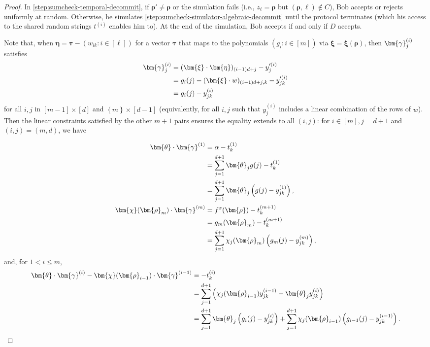 \documentclass[a4paper,UKenglish,cleveref, autoref, thm-restate]{lipics-v2021}
\theoremstyle{definition}
\renewcommand{\set}[1]{\left\{#1\right\}}
\newcommand{\vcommitstring}{z}
\newcommand{\pcommitstring}{y}
\newcommand{\dimension}{m}
\newcommand{\degree}{d}
\newcommand{\fingerprinttuple}{\bm{\rho}}
\def\fe#1{
    \ifnum#1=1
        \alpha
    \else
    \ifnum#1=2
        \beta
    \else
    \ifnum#1=3
        \gamma
    \fi\fi\fi
}
\begin{document}
\begin{proof}
    In \cref{step:sumcheck-temporal-decommit}, if $\fingerprinttuple' \neq \fingerprinttuple$ or the simulation fails (i.e., $\vcommitstring_\ell = \fingerprinttuple$ but $(\fingerprinttuple, \ell) \notin C$), Bob accepts or rejects uniformly at random. Otherwise, he simulates \cref{step:sumcheck-simulator-algebraic-decommit} until the protocol terminates (which his access to the shared random strings $t^{(i)}$ enables him to).
    At the end of the simulation, Bob accepts if and only if $D$ accepts.
    
    Note that, when $\bm{\eta} = \bm{\tau} - (w_{ik} : i \in [\ell])$ for a vector $\bm{\tau}$ that maps to the polynomials $(g_i : i \in [\dimension])$ via $\bm{\xi} = \bm{\xi}(\fingerprinttuple)$, then $\bm{\fe3}^{(i)}_j$ satisfies
    \begin{align*}
        \bm{\fe3}^{(i)}_j &= (\bm{\xi} \cdot \bm{\eta})_{(i - 1) \degree + j} -  \pcommitstring'^{(i)}_j\\
        &= g_i(j) - (\bm{\xi} \cdot w)_{(i - 1) \degree + j, k} - \pcommitstring'^{(i)}_{jk}\\
        &= g_i(j) - \pcommitstring^{(i)}_{jk}
    \end{align*}
    for all $i,j$ in $[\dimension - 1] \times [\degree]$ and $\set{\dimension} \times [\degree - 1]$ (equivalently, for all $i,j$ such that $\pcommitstring^{(i)}_j$ includes a linear combination of the rows of $w$). Then the linear constraints satisfied by the other $\dimension + 1$ pairs ensures the equality extends to all $(i, j)$: for $i \in [\dimension], j = \degree + 1$ and $(i, j) = (\dimension, \degree)$, we have
    
    \begin{align*}
        \bm{\theta} \cdot \bm{\fe3}^{(1)} &= \fe1 - t_k^{(1)}\\
        &= \sum_{j = 1}^{\degree + 1} \bm{\theta}_j g(j) - t_k^{(1)}\\
        &= \sum_{j = 1}^{\degree + 1} \bm{\theta}_j \left(g(j) - \pcommitstring_{jk}^{(1)}\right),\\
        \bm{\chi}(\fingerprinttuple_\dimension) \cdot \bm{\fe3}^{(\dimension)} &= f^x(\fingerprinttuple) - t_k^{(\dimension+1)}\\
        &= g_\dimension(\fingerprinttuple_\dimension) - t_k^{(\dimension+1)}\\
        &= \sum_{j = 1}^{\degree + 1} \chi_j(\fingerprinttuple_\dimension) \left(g_\dimension(j) - \pcommitstring^{(\dimension)}_{jk}\right),
    \end{align*}
    and, for $1 < i \leq \dimension$,
    \begin{align*}
        \bm{\theta} \cdot \bm{\fe3}^{(i)} - \bm{\chi}(\fingerprinttuple_{i-1}) \cdot \bm{\fe3}^{(i-1)} &= -t_k^{(i)}\\
        &= \sum_{j = 1}^{\degree + 1} \left(\chi_j(\fingerprinttuple_{i-1}) \pcommitstring^{(i-1)}_{jk} - \bm{\theta}_j \pcommitstring^{(i)}_{jk}\right)\\
         &= \sum_{j = 1}^{\degree + 1} \bm{\theta}_j \left(g_i(j)- \pcommitstring^{(i)}_{jk}\right) + \sum_{j = 1}^{\degree + 1} \chi_j(\fingerprinttuple_{i-1}) \left(g_{i-1}(j)- \pcommitstring^{(i-1)}_{jk}\right).
    \end{align*}
    

\end{proof}
\end{document}
